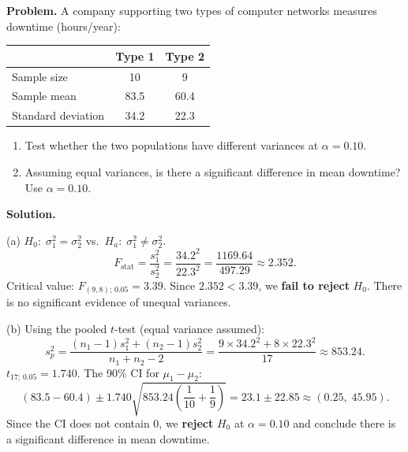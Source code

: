 \documentclass[10pt]{report}
\begin{document}
\begin{hwbox}
\textbf{Problem.} A company supporting two types of computer networks measures downtime (hours/year):

\begin{center}
\begin{tabular}{lcc}
\hline
 & Type 1 & Type 2 \\
\hline
Sample size & 10 & 9 \\
Sample mean & 83.5 & 60.4 \\
Standard deviation & 34.2 & 22.3 \\
\hline
\end{tabular}
\end{center}

\begin{enumerate}[label=(\alph*)]
  \item Test whether the two populations have different variances at $\alpha = 0.10$.
  \item Assuming equal variances, is there a significant difference in mean downtime? Use $\alpha = 0.10$.
\end{enumerate}

\textbf{Solution.}

(a) $H_0{:}\; \sigma_1^2 = \sigma_2^2$ vs.\ $H_a{:}\; \sigma_1^2 \neq \sigma_2^2$.
\[
F_{\text{stat}} = \frac{s_1^2}{s_2^2} = \frac{34.2^2}{22.3^2} = \frac{1169.64}{497.29} \approx 2.352.
\]
Critical value: $F_{(9,8);\, 0.05} = 3.39$. Since $2.352 < 3.39$, we \textbf{fail to reject} $H_0$. There is no significant evidence of unequal variances.

(b) Using the pooled $t$-test (equal variance assumed):
\[
s_p^2 = \frac{(n_1-1)s_1^2 + (n_2-1)s_2^2}{n_1+n_2-2} = \frac{9 \times 34.2^2 + 8 \times 22.3^2}{17} \approx 853.24.
\]
$t_{17;\, 0.05} = 1.740$. The 90\% CI for $\mu_1 - \mu_2$:
\[
(83.5 - 60.4) \pm 1.740\sqrt{853.24\left(\frac{1}{10}+\frac{1}{9}\right)} = 23.1 \pm 22.85 \approx (0.25,\; 45.95).
\]
Since the CI does not contain 0, we \textbf{reject} $H_0$ at $\alpha = 0.10$ and conclude there is a significant difference in mean downtime.
\end{hwbox}
\end{document}
